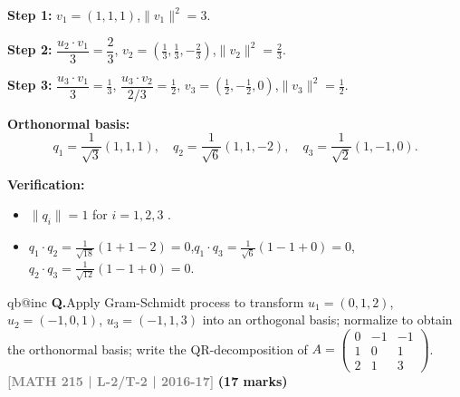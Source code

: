 \documentclass[12pt,a3paper]{article}
\makeatletter
\newcommand{\yr}[1]{\hfill\textcolor{gray}{\small\textbf{[#1]}}}
\newcommand{\mk}[1]{\textcolor{orange!70!black}{\small\textbf{(#1 marks)}}}
\newcounter{qnum}
\newcommand{\Q}[1]{%
  \csname qb@inc\endcsname
  \needspace{4\baselineskip}
  \refstepcounter{qnum}
  \vspace{6pt}
  \noindent\textbf{Q\theqnum.}\enspace #1\par
}
\makeatother
\begin{document}
\begin{tcolorbox}[enhanced,breakable,
  colback=cD!4,colframe=cD,boxrule=0.8pt,arc=5pt,
  title={\textbf{Answer --- Gram-Schmidt $u_1=(1,1,1)$, $u_2=(1,1,0)$, $u_3=(1,0,0)$; Verify Orthonormality}},
  fonttitle=\bfseries\color{white},colbacktitle=cD]

\textbf{Step 1:} $v_1=(1,1,1)$,\quad $\|v_1\|^2=3$.

\textbf{Step 2:} $\dfrac{u_2\cdot v_1}{3}=\dfrac{2}{3}$,\quad
$v_2=\left(\tfrac{1}{3},\tfrac{1}{3},-\tfrac{2}{3}\right)$,\quad $\|v_2\|^2=\tfrac{2}{3}$.

\textbf{Step 3:} $\dfrac{u_3\cdot v_1}{3}=\tfrac{1}{3}$,\;
$\dfrac{u_3\cdot v_2}{2/3}=\tfrac{1}{2}$,\quad
$v_3=\left(\tfrac{1}{2},-\tfrac{1}{2},0\right)$,\quad $\|v_3\|^2=\tfrac{1}{2}$.

\textbf{Orthonormal basis:}
\[
q_1=\frac{1}{\sqrt{3}}(1,1,1),\quad
q_2=\frac{1}{\sqrt{6}}(1,1,-2),\quad
q_3=\frac{1}{\sqrt{2}}(1,-1,0).
\]

\textbf{Verification:}
\begin{itemize}[itemsep=2pt]
  \item $\|q_i\|=1$ for $i=1,2,3$ . \checkmark
  \item $q_1\cdot q_2=\tfrac{1}{\sqrt{18}}(1+1-2)=0$,\quad $q_1\cdot q_3=\tfrac{1}{\sqrt{6}}(1-1+0)=0$,\quad $q_2\cdot q_3=\tfrac{1}{\sqrt{12}}(1-1+0)=0$. \checkmark
\end{itemize}

\end{tcolorbox}


\Q{Apply Gram-Schmidt process to transform $u_1 = (0,1,2)$, $u_2 = (-1,0,1)$, $u_3 = (-1,1,3)$ into an orthogonal basis; normalize to obtain the orthonormal basis; write the QR-decomposition of $A = \begin{pmatrix} 0 & -1 & -1 \\ 1 & 0 & 1 \\ 2 & 1 & 3 \end{pmatrix}$.
\yr{MATH 215 | L-2/T-2 | 2016-17} \mk{17}}
\end{document}
